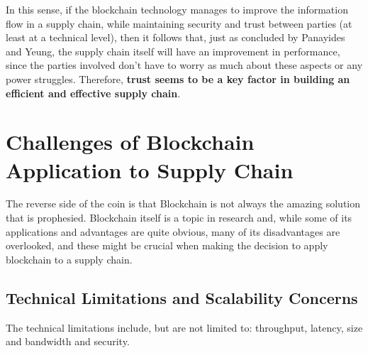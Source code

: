 
In this sense, if the blockchain technology manages to improve the information flow in a supply chain, while maintaining security and trust between parties (at least at a technical level), then it follows that, just as concluded by Panayides and Yeung, the supply chain itself will have an improvement in performance, since the parties involved don't have to worry as much about these aspects or any power struggles. Therefore, \textbf{trust seems to be a key factor in building an efficient and effective supply chain}.

\section{Challenges of Blockchain Application to Supply Chain}


The reverse side of the coin is that Blockchain is not always the amazing solution that is prophesied. Blockchain itself is a topic in research and, while some of its applications and advantages are quite obvious, many of its disadvantages are overlooked, and these might be crucial when making the decision to apply blockchain to a supply chain.


\subsection{Technical Limitations and Scalability Concerns}
The technical limitations include, but are not limited to: throughput, latency, size and bandwidth and security.

